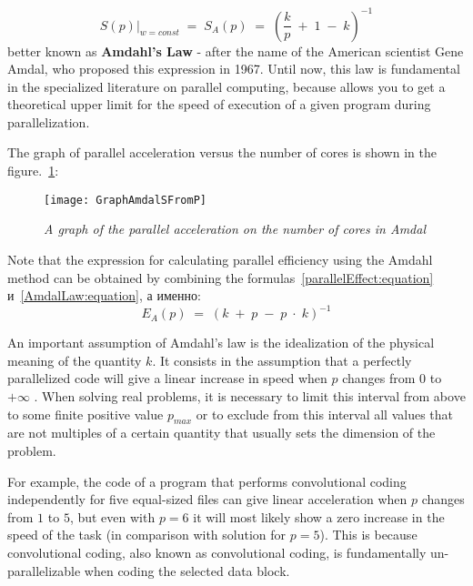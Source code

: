 {	\begin{equation}
		\label{AmdalLaw:equation}
		\left.S(p)\right|_{w=const}\;=\;S_A(p)\;=\;\left(\frac kp\;+\;1\;-\;k\right)^{-1}
	\end{equation}
	better known as \textbf{Amdahl’s Law} - after the name of the American scientist Gene Amdal, who proposed this expression in 1967. Until now, this law is fundamental in the specialized literature on parallel computing, because allows you to get a theoretical upper limit for the speed of execution of a given program during parallelization.
	\par The graph of parallel acceleration versus the number of cores is shown in the figure.~\ref{GraphAmdalSFromP:image}:
	\begin{figure}[H]
		\texttt{[image: GraphAmdalSFromP]}
		\caption{\textit{A graph of the parallel acceleration on the number of cores in Amdal}}
		\label{GraphAmdalSFromP:image}
	\end{figure}
	\par Note that the expression for calculating parallel efficiency using the Amdahl method can be obtained by combining the formulas~\eqref{parallelEffect:equation} и~\eqref{AmdalLaw:equation}, а именно:
	\begin{equation}
		E_A(p)\;=\;\left(k\;+\;p\;-\;p\;\cdot\;k\right)^{-1}
	\end{equation}
	\par An important assumption of Amdahl's law is the idealization of the physical meaning of the quantity $k$. It consists in the assumption that a perfectly parallelized code will give a linear increase in speed when $ p $ changes from $0$ to $+\infty$ . When solving real problems, it is necessary to limit this interval from above to some finite positive value $p_{max}$ or to exclude from this interval all values that are not multiples of a certain quantity that usually sets the dimension of the problem.
	\par For example, the code of a program that performs convolutional coding independently for five equal-sized files can give linear acceleration when $p$ changes from $1$ to $5$, but even with $p = 6$ it will most likely show a zero increase in the speed of the task (in comparison with solution for $p = 5$). This is because convolutional coding, also known as convolutional coding, is fundamentally un-parallelizable when coding the selected data block.
	\par
}